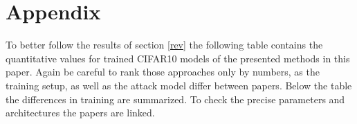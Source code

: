 \documentclass[conference]{IEEEtran}
\begin{document}
\newpage

\section{Appendix}

To better follow the results of section \ref{rev} the following table contains the quantitative values for trained CIFAR10 models of the presented methods in this paper. Again be careful to rank those approaches only by numbers, as the training setup, as well as the attack model differ between papers. Below the table the differences in training are summarized. To check the precise parameters and architectures the papers are linked.

\vspace*{-0.2cm}
\end{document}

